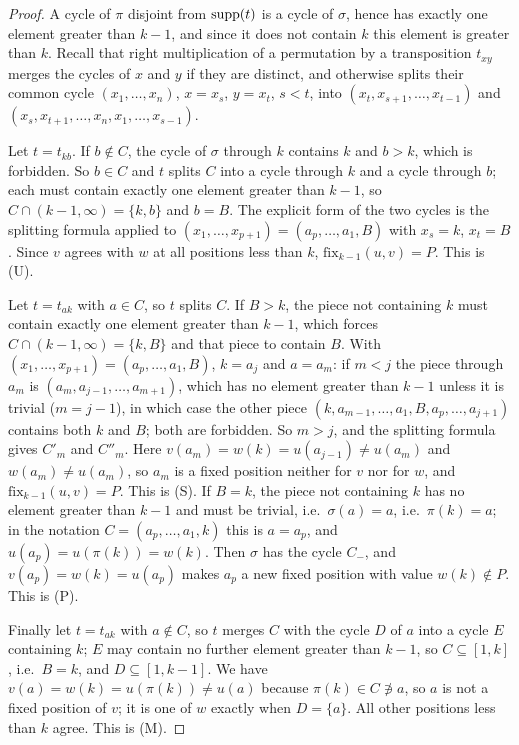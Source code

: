 \documentclass{amsart}
\theoremstyle{definition}
\theoremstyle{remark}
\numberwithin{equation}{section}
\newcommand{\fx}{\mathrm{fix}}
\begin{document}
\begin{proof}
A cycle of $\pi$ disjoint from $\mathrm{supp}(t)$ is a cycle of $\sigma$, hence has exactly one element greater than $k-1$, and since it does not contain $k$ this element is greater than $k$. Recall that right multiplication of a permutation by a transposition $t_{xy}$ merges the cycles of $x$ and $y$ if they are distinct, and otherwise splits their common cycle $(x_1,\ldots,x_n)$, $x=x_s$, $y=x_t$, $s<t$, into $(x_t,x_{s+1},\ldots,x_{t-1})$ and $(x_s,x_{t+1},\ldots,x_n,x_1,\ldots,x_{s-1})$.

Let $t=t_{kb}$. If $b\notin C$, the cycle of $\sigma$ through $k$ contains $k$ and $b>k$, which is forbidden. So $b\in C$ and $t$ splits $C$ into a cycle through $k$ and a cycle through $b$; each must contain exactly one element greater than $k-1$, so $C\cap(k-1,\infty)=\{k,b\}$ and $b=B$. The explicit form of the two cycles is the splitting formula applied to $(x_1,\ldots,x_{p+1})=(a_p,\ldots,a_1,B)$ with $x_s=k$, $x_t=B$. Since $v$ agrees with $w$ at all positions less than $k$, $\fx_{k-1}(u,v)=P$. This is (U).

Let $t=t_{ak}$ with $a\in C$, so $t$ splits $C$. If $B>k$, the piece not containing $k$ must contain exactly one element greater than $k-1$, which forces $C\cap(k-1,\infty)=\{k,B\}$ and that piece to contain $B$. With $(x_1,\ldots,x_{p+1})=(a_p,\ldots,a_1,B)$, $k=a_j$ and $a=a_m$: if $m<j$ the piece through $a_m$ is $(a_m,a_{j-1},\ldots,a_{m+1})$, which has no element greater than $k-1$ unless it is trivial ($m=j-1$), in which case the other piece $(k,a_{m-1},\ldots,a_1,B,a_p,\ldots,a_{j+1})$ contains both $k$ and $B$; both are forbidden. So $m>j$, and the splitting formula gives $C'_m$ and $C''_m$. Here $v(a_m)=w(k)=u(a_{j-1})\neq u(a_m)$ and $w(a_m)\neq u(a_m)$, so $a_m$ is a fixed position neither for $v$ nor for $w$, and $\fx_{k-1}(u,v)=P$. This is (S). If $B=k$, the piece not containing $k$ has no element greater than $k-1$ and must be trivial, i.e.\ $\sigma(a)=a$, i.e.\ $\pi(k)=a$; in the notation $C=(a_p,\ldots,a_1,k)$ this is $a=a_p$, and $u(a_p)=u(\pi(k))=w(k)$. Then $\sigma$ has the cycle $C_-$, and $v(a_p)=w(k)=u(a_p)$ makes $a_p$ a new fixed position with value $w(k)\notin P$. This is (P).

Finally let $t=t_{ak}$ with $a\notin C$, so $t$ merges $C$ with the cycle $D$ of $a$ into a cycle $E$ containing $k$; $E$ may contain no further element greater than $k-1$, so $C\subseteq[1,k]$, i.e.\ $B=k$, and $D\subseteq[1,k-1]$. We have $v(a)=w(k)=u(\pi(k))\neq u(a)$ because $\pi(k)\in C\not\ni a$, so $a$ is not a fixed position of $v$; it is one of $w$ exactly when $D=\{a\}$. All other positions less than $k$ agree. This is (M).
\end{proof}
\end{document}
